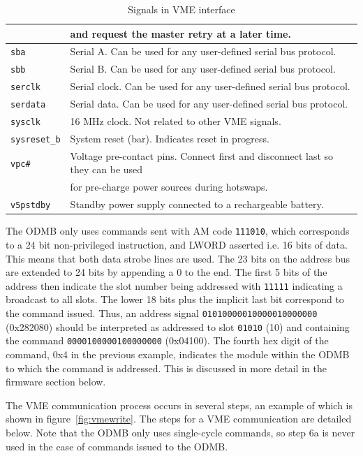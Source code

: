 \documentclass[10pt,a4paper]{article}
\begin{document}
\begin{table}[H]
\begin{tabular}{|l|l|}
                 & and request the master retry at a later time.\\ \hline
\texttt{sba}& Serial A. Can be used for any user-defined serial bus protocol.\\ \hline
\texttt{sbb}& Serial B. Can be used for any user-defined serial bus protocol.\\ \hline
\texttt{serclk}& Serial clock. Can be used for any user-defined serial bus protocol.\\ \hline
\texttt{serdata}& Serial data. Can be used for any user-defined serial bus protocol.\\ \hline
\texttt{sysclk}& 16 MHz clock. Not related to other VME signals.\\ \hline
\texttt{sysreset\_b}& System reset (bar). Indicates reset in progress.\\ \hline
\texttt{vpc\#}& Voltage pre-contact pins. Connect first and disconnect last so they can be used\\
              & for pre-charge power sources during hotswaps.\\ \hline
\texttt{v5pstdby}& Standby power supply connected to a rechargeable battery.\\ \hline
\end{tabular}
\caption{Signals in VME interface}
\label{tab:vmeinterface}
\end{table}

The ODMB only uses commands sent with AM code \texttt{111010}, which corresponds to a 24 bit non-privileged instruction, and LWORD asserted i.e. 16 bits of data. This means that both data strobe lines are used. The 23 bits on the address bus are extended to 24 bits by appending a 0 to the end. The first 5 bits of the address then indicate the slot number being addressed with \texttt{11111} indicating a broadcast to all slots. The lower 18 bits plus the implicit last bit correspond to the command issued. Thus, an address signal \texttt{01010000010000010000000} (0x282080) should be interpreted as addressed to slot \texttt{01010} (10) and containing the command \texttt{0000100000100000000} (0x04100). The fourth hex digit of the command, 0x4 in the previous example, indicates the module within the ODMB to which the command is addressed. This is discussed in more detail in the firmware section below.

The VME communication process occurs in several steps, an example of which is shown in figure~\ref{fig:vmewrite}. The steps for a VME communication are detailed below. Note that the ODMB only uses single-cycle commands, so step 6a is never used in the case of commands issued to the ODMB.
\end{document}
